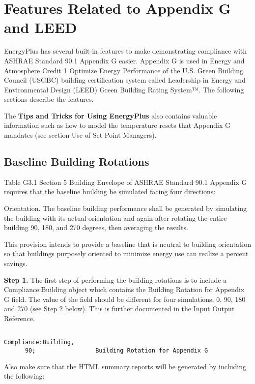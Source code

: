 \section{Features Related to Appendix G and LEED}\label{features-related-to-appendix-g-and-leed}

EnergyPlus has several built-in features to make demonstrating compliance with ASHRAE Standard 90.1 Appendix G easier. Appendix G is used in Energy and Atmosphere Credit 1 Optimize Energy Performance of the U.S. Green Building Council (USGBC) building certification system called Leadership in Energy and Environmental Design (LEED) Green Building Rating System™. The following sections describe the features.

The \textbf{Tips and Tricks for Using EnergyPlus} also contains valuable information such as how to model the temperature resets that Appendix G mandates (see section Use of Set Point Managers).

\subsection{Baseline Building Rotations}\label{baseline-building-rotations}

Table G3.1 Section 5 Building Envelope of ASHRAE Standard 90.1 Appendix G requires that the baseline building be simulated facing four directions:

Orientation. The baseline building performance shall be generated by simulating the building with its actual orientation and again after rotating the entire building 90, 180, and 270 degrees, then averaging the results.

This provision intends to provide a baseline that is neutral to building orientation so that buildings purposely oriented to minimize energy use can realize a percent savings.

\textbf{Step 1.} The first step of performing the building rotations is to include a Compliance:Building object which contains the Building Rotation for Appendix G field. The value of the field should be different for four simulations, 0, 90, 180 and 270 (see Step 2 below). This is further documented in the Input Output Reference.

\begin{lstlisting}

Compliance:Building,
      90;                 Building Rotation for Appendix G
\end{lstlisting}

Also make sure that the HTML summary reports will be generated by including the following:

